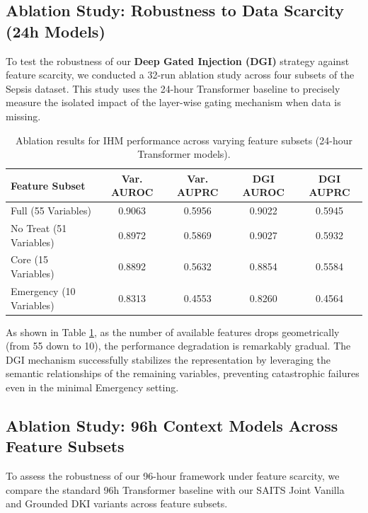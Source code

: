 \subsection{Ablation Study: Robustness to Data Scarcity (24h Models)}

To test the robustness of our \textbf{Deep Gated Injection (DGI)} strategy against feature scarcity, we conducted a 32-run ablation study across four subsets of the Sepsis dataset. This study uses the 24-hour Transformer baseline to precisely measure the isolated impact of the layer-wise gating mechanism when data is missing.

\begin{table}[ht]
\centering
\caption{Ablation results for IHM performance across varying feature subsets (24-hour Transformer models).}
\label{tab:saits_ihm_ablation}
\begin{tabular}{lcccc}
\toprule
\textbf{Feature Subset} & \textbf{Var. AUROC} & \textbf{Var. AUPRC} & \textbf{DGI AUROC} & \textbf{DGI AUPRC} \\
\midrule
Full (55 Variables)     & 0.9063 & 0.5956 & 0.9022 & 0.5945 \\
No Treat (51 Variables) & 0.8972 & 0.5869 & 0.9027 & 0.5932 \\
Core (15 Variables)     & 0.8892 & 0.5632 & 0.8854 & 0.5584 \\
Emergency (10 Variables)& 0.8313 & 0.4553 & 0.8260 & 0.4564 \\
\bottomrule
\end{tabular}
\end{table}

As shown in Table \ref{tab:saits_ihm_ablation}, as the number of available features drops geometrically (from 55 down to 10), the performance degradation is remarkably gradual. The DGI mechanism successfully stabilizes the representation by leveraging the semantic relationships of the remaining variables, preventing catastrophic failures even in the minimal Emergency setting.

\subsection{Ablation Study: 96h Context Models Across Feature Subsets}

To assess the robustness of our 96-hour framework under feature scarcity, we compare the standard 96h Transformer baseline with our SAITS Joint Vanilla and Grounded DKI variants across feature subsets.


